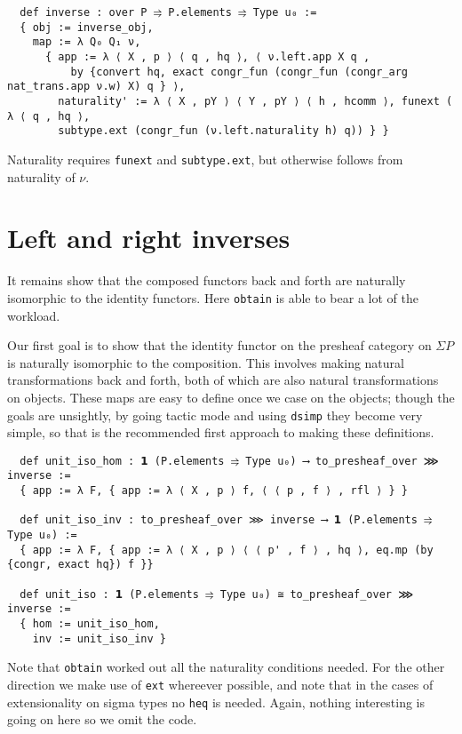 \documentclass{article}
\newcommand{\<}{\langle}
\renewcommand{\>}{\rangle}
\theoremstyle{definitionstyle}
\theoremstyle{exercisestyle}
\theoremstyle{remarkstyle}
\begin{document}
\begin{lstlisting}
  def inverse : over P ⥤ P.elements ⥤ Type u₀ :=
  { obj := inverse_obj,
    map := λ Q₀ Q₁ ν,
      { app := λ ⟨ X , p ⟩ ⟨ q , hq ⟩, ⟨ ν.left.app X q ,
          by {convert hq, exact congr_fun (congr_fun (congr_arg nat_trans.app ν.w) X) q } ⟩,
        naturality' := λ ⟨ X , pY ⟩ ⟨ Y , pY ⟩ ⟨ h , hcomm ⟩, funext ( λ ⟨ q , hq ⟩,
        subtype.ext (congr_fun (ν.left.naturality h) q)) } } \end{lstlisting}

Naturality requires \texttt{funext} and \texttt{subtype.ext},
but otherwise follows from naturality of $\nu$.

\section{Left and right inverses}

It remains show that the composed functors back and forth are naturally
isomorphic to the identity functors.
Here \texttt{obtain} is able to bear a lot of the workload.

Our first goal is to show that the identity functor on the presheaf
category on $\Sigma P$ is naturally isomorphic to the composition.
This involves making natural transformations back and forth,
both of which are also natural transformations on objects.
These maps are easy to define once we case on the objects;
though the goals are unsightly,
by going tactic mode and using \texttt{dsimp} they become very simple,
so that is the recommended first approach to making these definitions.

\begin{lstlisting}
  def unit_iso_hom : 𝟭 (P.elements ⥤ Type u₀) ⟶ to_presheaf_over ⋙ inverse :=
  { app := λ F, { app := λ ⟨ X , p ⟩ f, ⟨ ⟨ p , f ⟩ , rfl ⟩ } }

  def unit_iso_inv : to_presheaf_over ⋙ inverse ⟶ 𝟭 (P.elements ⥤ Type u₀) :=
  { app := λ F, { app := λ ⟨ X , p ⟩ ⟨ ⟨ p' , f ⟩ , hq ⟩, eq.mp (by {congr, exact hq}) f }}

  def unit_iso : 𝟭 (P.elements ⥤ Type u₀) ≅ to_presheaf_over ⋙ inverse :=
  { hom := unit_iso_hom,
    inv := unit_iso_inv } \end{lstlisting}

Note that \texttt{obtain} worked out all the naturality conditions needed.
For the other direction we make use of \texttt{ext} whereever possible,
and note that in the cases of extensionality on sigma types no \texttt{heq}
is needed. Again, nothing interesting is going on here so we omit the code.

{}

\end{document}
